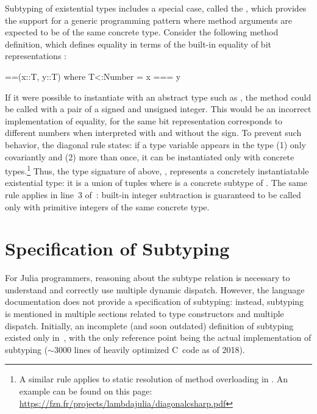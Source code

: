 Subtyping of existential types includes a special case, called 
the , which provides the support for
a generic programming pattern where method arguments are expected
to be of the same concrete type.
Consider the following method definition, which defines equality
\cjl{(==)} in terms of the built-in equality of bit representations \cjl{(===)}:
\begin{codeenvd}
\begin{julia}
==(x::T, y::T) where T<:Number = x === y
\end{julia}
\end{codeenvd}
If it were possible to instantiate  with an abstract type such as
, the method could be called with a pair of a signed and unsigned
integer. This would be an incorrect implementation of equality, for the same bit
representation corresponds to different numbers when interpreted with and
without the sign.
To prevent such behavior, the diagonal rule states: if a type variable
appears in the type (1) only covariantly and (2) more than once,
it can be instantiated
only with concrete types.\footnote{A similar rule applies to static resolution
of method overloading in \CSharp. An example can be found on this page:
\href{https://fzn.fr/projects/lambdajulia/diagonalcsharp.pdf}{https://fzn.fr/projects/lambdajulia/diagonalcsharp.pdf}}
Thus, the type signature of \cjl{(==)} above,
, represents a concretely instantiatable
existential type:
it is a union of tuples  where  is a concrete subtype
of . The same rule applies in line~3
of~: built-in integer subtraction  is
guaranteed to be called only with primitive integers of the same concrete type.

\section{Specification of Subtyping}\label{sec:julia-sub:lambda-julia}

For Julia programmers, reasoning about the subtype relation is necessary
to understand and correctly use multiple dynamic dispatch.
However, the language documentation does not provide a specification
of subtyping: instead, subtyping is mentioned in multiple sections related to
type constructors and multiple dispatch.
Initially, an incomplete (and soon outdated) definition of subtyping existed 
only in~\cite{bib:bezanson:julia:2015}, with the only reference point
being the actual implementation of subtyping ($\sim$3000 lines 
of heavily optimized C~code as of 2018).

